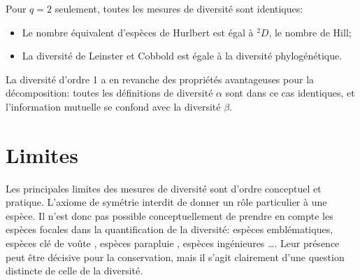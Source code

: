 \documentclass[
  11pt,
  french,
  a4paper,
  extrafontsizes,onecolumn,openright
  ]{memoir}
\providecommand{\tightlist}{%
  \setlength{\itemsep}{0pt}\setlength{\parskip}{0pt}}
\begin{document}
Pour \(q=2\) seulement, toutes les mesures de diversité sont identiques:

\begin{itemize}
\tightlist
\item
  Le nombre équivalent d'espèces de Hurlbert est égal à \(^{2}\!D\), le nombre de Hill;
\item
  La diversité de Leinster et Cobbold est égale à la diversité phylogénétique.
\end{itemize}

La diversité d'ordre 1 a en revanche des propriétés avantageuses pour la décomposition: toutes les définitions de diversité \(\alpha\) sont dans ce cas identiques, et l'information mutuelle se confond avec la diversité \(\beta\).

\hypertarget{limites}{%
\section{Limites}\label{limites}}

Les principales limites des mesures de diversité sont d'ordre conceptuel et pratique.
L'axiome de symétrie interdit de donner un rôle particulier à une espèce.
Il n'est donc pas possible conceptuellement de prendre en compte les espèces focales \autocite{Zacharias2001} dans la quantification de la diversité: espèces emblématiques, espèces clé de voûte \autocite{Paine1969}, espèces parapluie \autocite{Roberge2004}, espèces ingénieures \autocite{Jones1994}\ldots.
Leur présence peut être décisive pour la conservation, mais il s'agit clairement d'une question distincte de celle de la diversité.
\end{document}
